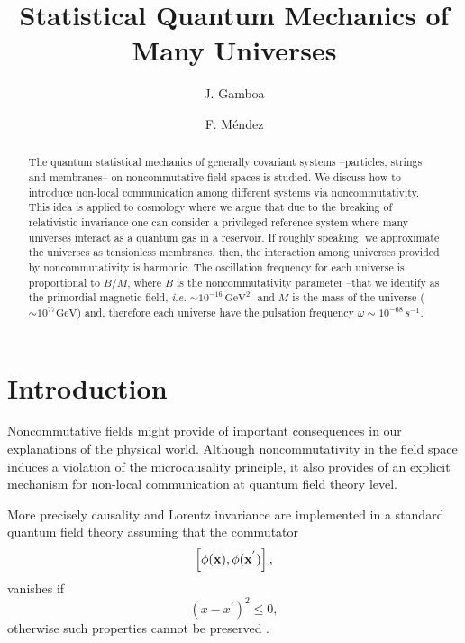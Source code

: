 \documentclass[a4paper,aps,twocolumn,amsfonts]{revtex4}
\begin{document}
   \title{Statistical Quantum Mechanics of Many Universes}
   \author{J. Gamboa
   }
   \author{F. M\'endez}
   \begin{abstract}
   The quantum statistical mechanics of generally covariant systems --particles, strings and membranes-- on noncommutative field spaces is studied.  We discuss how to introduce non-local communication among different systems via noncommutativity. This idea is applied to cosmology where we argue that due to the breaking of relativistic invariance  one can consider a privileged  reference system where many universes interact as a quantum gas in a reservoir. If roughly  speaking, we approximate the universes as tensionless membranes, then,  the interaction among universes 
   provided by noncommutativity is harmonic. The oscillation frequency for each universe is proportional to $B/M$, where $B$ is the  noncommutativity parameter  --that we identify as the primordial magnetic field,  {\it i.e.}  $\sim 10^{-16}\, \mbox{GeV}^2$- and $M$ is the mass of the 
   universe ( $\sim 10^{77} \mbox{GeV}$) and, therefore each universe have the  pulsation frequency  $\omega \sim 10^{-68} \,s^{-1}$.  
   \end{abstract}
   \maketitle

   \section{Introduction}
   Noncommutative fields might provide of important consequences in our explanations of the physical world. Although noncommutativity in the field space induces a violation of the microcausality principle, it also provides of an explicit mechanism for non-local communication at quantum field theory level.

   More precisely  causality and Lorentz invariance are implemented in a standard quantum field theory assuming that the commutator 
   \begin{equation}
   \left[ \phi ({\bf x}), \phi ({\bf x}^{'})\right], \label{1}
   \end{equation}
   vanishes  if 
   \begin{equation}
   (x - x^{'})^2 \leq 0,  \label{2}
   \end{equation}
otherwise such properties cannot be preserved \cite{kos} . 
\end{document}
